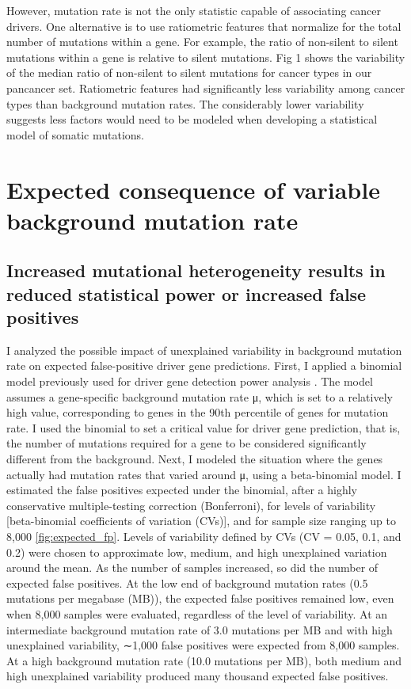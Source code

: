 However, mutation rate is not the only statistic capable of associating cancer drivers. One alternative is to use ratiometric features that normalize for the total number of mutations within a gene. For example, the ratio of non-silent to silent mutations within a gene is relative to silent mutations. Fig 1 shows the variability of the median ratio of non-silent to silent mutations for cancer types in our pancancer set. Ratiometric features had significantly less variability among cancer types than background mutation rates. The considerably lower variability suggests less factors would need to be modeled when developing a statistical model of somatic mutations.

\section{Expected consequence of variable background mutation rate}

\subsection{Increased mutational heterogeneity results in reduced statistical power or increased false positives}

I analyzed the possible impact of unexplained variability in background mutation rate on expected false-positive driver gene predictions. First, I applied a binomial model previously used for driver gene detection power analysis \cite{RN14}. The model assumes a gene-specific background mutation rate μ, which is set to a relatively high value, corresponding to genes in the 90th percentile of genes for mutation rate. I used the binomial to set a critical value for driver gene prediction, that is, the number of mutations required for a gene to be considered significantly different from the background. Next, I modeled the situation where the genes actually had mutation rates that varied around μ, using a beta-binomial model. I estimated the false positives expected under the binomial, after a highly conservative multiple-testing correction (Bonferroni), for levels of variability [beta-binomial coefficients of variation (CVs)], and for sample size ranging up to 8,000 \ref{fig:expected_fp}. Levels of variability defined by CVs (CV = 0.05, 0.1, and 0.2) were chosen to approximate low, medium, and high unexplained variation around the mean. As the number of samples increased, so did the number of expected false positives. At the low end of background mutation rates (0.5 mutations per megabase (MB)), the expected false positives remained low, even when 8,000 samples were evaluated, regardless of the level of variability. At an intermediate background mutation rate of 3.0 mutations per MB and with high unexplained variability, ∼1,000 false positives were expected from 8,000 samples. At a high background mutation rate (10.0 mutations per MB), both medium and high unexplained variability produced many thousand expected false positives.

